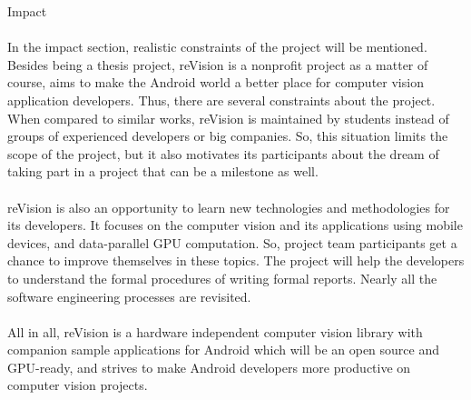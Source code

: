 \documentclass[12pt, a4paper]{article} \pagenumbering{gobble}
\begin{document}
\begin{section}{Impact}

\paragraph{}{
In the impact section, realistic constraints of the project will be mentioned. Besides being a thesis project,
reVision is a nonprofit project as a matter of course, aims to make the Android world a better place for computer vision
application developers. Thus, there are several constraints about the project. When compared to similar works,
reVision is maintained by students instead of groups of experienced developers or big companies.
So, this situation limits the scope of the project, but it also motivates its participants about the dream of
taking part in a project that can be a milestone as well.

}

\paragraph{}{
  reVision is also an opportunity to learn new technologies and methodologies for its developers. It focuses on the
  computer vision and its applications using mobile devices, and data-parallel GPU computation. So, project team participants
  get a chance to improve themselves in these topics. The project will help the developers to understand the formal procedures
  of writing formal reports. Nearly all the software engineering processes are revisited.
}

\paragraph{}{
  All in all,  reVision is a hardware independent computer vision library with companion sample applications
  for Android which will be an open source and GPU-ready, and strives to make Android developers more productive
  on computer vision projects.

}

\end{section}
\end{document}
